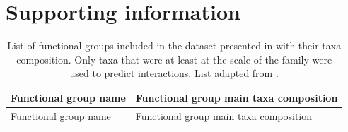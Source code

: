 \section{Supporting information}
\begin{singlespace}

  \begin{longtable}{ p{} p{} }
  \caption{List of functional groups included in the dataset presented in \citet{savenkoff2004} with their taxa composition. Only taxa that were at least at the scale of the family were used to predict interactions. List adapted from \citet{savenkoff2004}.}
  \label{ch2-tbl1}
  \tabularnewline
        \toprule
        Functional group name   & Functional group main taxa composition    \\
        \hline \hline
        \endfirsthead

        \toprule
        Functional group name   & Functional group main taxa composition    \\
        \hline \hline
        \endhead


\end{longtable}
\end{singlespace}
